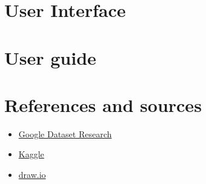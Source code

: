 \documentclass{article}
\begin{document}
\section{User Interface}
\section{User guide}
\section{References and sources}
\begin{itemize}
    \item \href{https://datasetsearch.research.google.com}{Google Dataset Research}
    \item \href{https://www.kaggle.com/aleanfigeno/contact-tracing-application-sample-datasets/tasks}{Kaggle}
    \item \href{https://app.diagrams.net}{draw.io}
\end{itemize}
\end{document}
